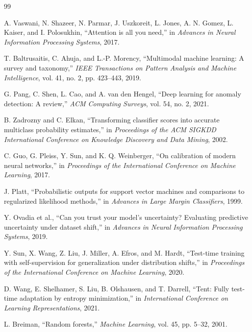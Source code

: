 \documentclass[10pt,conference]{IEEEtran}
\begin{document}
\begin{thebibliography}{99}

A. Vaswani, N. Shazeer, N. Parmar, J. Uszkoreit, L. Jones, A. N. Gomez,
L. Kaiser, and I. Polosukhin, ``Attention is all you need,'' in
\emph{Advances in Neural Information Processing Systems}, 2017.

T. Baltrusaitis, C. Ahuja, and L.-P. Morency, ``Multimodal machine learning:
A survey and taxonomy,'' \emph{IEEE Transactions on Pattern Analysis and Machine
Intelligence}, vol. 41, no. 2, pp. 423--443, 2019.

G. Pang, C. Shen, L. Cao, and A. van den Hengel, ``Deep learning for anomaly
detection: A review,'' \emph{ACM Computing Surveys}, vol. 54, no. 2, 2021.

B. Zadrozny and C. Elkan, ``Transforming classifier scores into accurate
multiclass probability estimates,'' in \emph{Proceedings of the ACM SIGKDD
International Conference on Knowledge Discovery and Data Mining}, 2002.

C. Guo, G. Pleiss, Y. Sun, and K. Q. Weinberger, ``On calibration of modern
neural networks,'' in \emph{Proceedings of the International Conference on
Machine Learning}, 2017.

J. Platt, ``Probabilistic outputs for support vector machines and comparisons
to regularized likelihood methods,'' in \emph{Advances in Large Margin
Classifiers}, 1999.

Y. Ovadia et al., ``Can you trust your model's uncertainty? Evaluating
predictive uncertainty under dataset shift,'' in \emph{Advances in Neural
Information Processing Systems}, 2019.

Y. Sun, X. Wang, Z. Liu, J. Miller, A. Efros, and M. Hardt, ``Test-time
training with self-supervision for generalization under distribution shifts,''
in \emph{Proceedings of the International Conference on Machine Learning}, 2020.

D. Wang, E. Shelhamer, S. Liu, B. Olshausen, and T. Darrell, ``Tent: Fully
test-time adaptation by entropy minimization,'' in \emph{International
Conference on Learning Representations}, 2021.

L. Breiman, ``Random forests,'' \emph{Machine Learning}, vol. 45, pp. 5--32,
2001.


\end{thebibliography}
\end{document}
